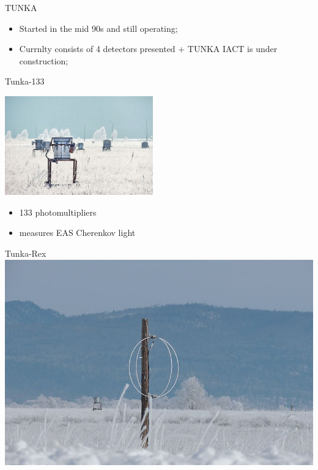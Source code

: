 \begin{frame}{TUNKA}
\footnotesize
\begin{itemize}
 \item Started in the mid 90s and still operating;
 \item Currnlty consists of 4 detectors presented + TUNKA IACT is under construction;
\end{itemize}
\vspace{-1em}
\begin{minipage}[t]{0.48\textwidth}
  \begin{block}{Tunka-133}
  \parbox{0.43\textwidth}{
    \centering
    \includegraphics[width=0.48\textwidth]{pics/Tunka-133.jpg}}
\parbox{0.55\textwidth}{
    \begin{itemize}
      \setlength{\itemsep}{0pt}
      \item 133 photomultipliers
      \item measures EAS Cherenkov light
    \end{itemize}
}
  \end{block}
\end{minipage}
\hfill
\begin{minipage}[t]{0.48\textwidth}
  \begin{block}{Tunka-Rex}
    \centering
    \includegraphics[height=0.23\textheight]{pics/Tunka-Rex.jpg}\vspace{-2ex}


\end{block}
\end{minipage}
\end{frame}
